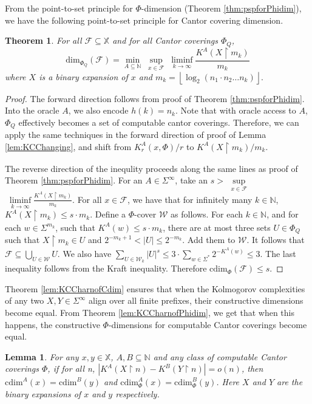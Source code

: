 \documentclass[11pt]{article}
\newtheorem{theorem}{Theorem}
\newtheorem{lemma}{Lemma}
\newcommand{\floor}[1]{ \left\lfloor #1 \right\rfloor }
\newcommand{\restr}{\upharpoonright}
\newcommand{\N}{\mathbb{N}}
\newcommand{\cdim}{\mathrm{cdim}}
\renewcommand{\dim}{{\mathrm{dim}}}
\newcommand{\F}{{\mathcal{F}}}
\newcommand{\X}{{\mathbb{X}}}
\newcommand{\UU}{{\mathcal{W}}}
\renewcommand{\F}{\mathcal{F}}
\newcommand{\x}{x}
\begin{document}
From the point-to-set principle for $\Phi$-dimension (Theorem
\ref{thm:pspforPhidim}), we have the following point-to-set
principle for Cantor covering dimension.

\begin{theorem}\label{thm:pspforCantor}
	For all $\mathcal{F} \subseteq \X$ and for all 
	Cantor coverings $\Phi_Q$, $$\dim_{\Phi_Q}(\mathcal{F}) =
	 \min\limits_{A \subseteq \N} \; \sup\limits_{\x \in \mathcal{F}} \; \liminf\limits_{k\to\infty} \frac{K^A(X
	 	\restr m_k)}{m_k}$$ where $X$ is a binary
	 expansion of $x$ and $m_k = \floor{\log_2(n_1 \cdot n_2 \dots
	 	n_k)}.$
\end{theorem}
\begin{proof}
	The forward direction follows from proof of Theorem \ref{thm:pspforPhidim}. Into the oracle $A$, we also encode $h(k) = n_k$.
	Note that with oracle access to $A$, $\Phi_Q$ effectively becomes a set of computable cantor coverings. Therefore, we can apply the same techniques in the forward direction of proof of Lemma \ref{lem:KCChanging}, and shift from $K^A_r(x, \Phi)/r$ to $K^A(X
	\restr m_k)/m_k$. 
	
		The reverse direction of the inequlity proceeds along the same lines as proof of Theorem \ref{thm:pspforPhidim}. 
	For an $A \in \Sigma^\infty$, take an $s >$ $\sup\limits_{\x \in \mathcal{F}} $ $\; \liminf\limits_{k\to\infty} \frac{K^A(X
		\restr m_k)}{m_k}$. For all $x \in \F$, we have that for infinitely many $k \in \N$, $K^A(X \restr m_k) \leq s\cdot m_k$. 
	Define a $\Phi$-cover $\UU$ as follows. For each $k \in \N$, and for each
	$w \in \Sigma^{m_k}$, such that $K^A(w) \leq s \cdot m_k$, there are at most three sets $U \in \Phi_Q$ such that $X \restr m_k \in U$ and $ 2^{-{m_k+1}} < |U| \leq 2^{-m_k}$. Add them to $\UU$.
	It follows that $\F \subseteq \bigcup_{U \in \UU} U $.
	We also have $\sum_{U \in \UU_k} |U|^s \leq 3 \cdot \sum_{w \in \Sigma^*} 2^{-K^A(w)} \leq 3$. The last inequality follows from the Kraft inequality. Therefore $\cdim_{\Phi}(\F) \leq s$.
\end{proof}



Theorem \ref{lem:KCCharnofCdim} ensures that when the Kolmogorov complexities of any two $X, Y \in \Sigma^\infty$ align over all finite prefixes, their constructive dimensions become equal.
From Theorem \ref{lem:KCCharnofPhidim}, we get that when this happens, the constructive $\Phi$-dimensions for computable Cantor coverings
become equal.

\begin{lemma} \label{lem:KCsameMeansDimsSame}
	For any $x,y \in \X$, $A,B \subseteq \N$ and any class of
	computable Cantor coverings $\Phi$, if for all n, $|K^A(X \restr
	n) - K^B(Y \restr n)| = o(n)$, then $\cdim^A(x) =
	\cdim^B(y)$ and $\cdim^A_\Phi(x) = \cdim^B_\Phi(y)$. Here $X$ and $Y$ are the binary expansions of $x$ and $y$ respectively. 
\end{lemma} 
\end{document}
